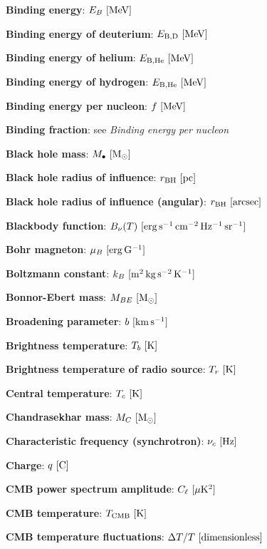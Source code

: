 \documentclass[a4paper,10pt]{article}
\begin{document}
{\noindent}\textbf{Binding energy}: $E_B ~ [{\rm MeV}]$

{\noindent}\textbf{Binding energy of deuterium}: $E_\mathrm{B,D} ~ [{\rm MeV}]$

{\noindent}\textbf{Binding energy of helium}: $E_\mathrm{B,He} ~ [{\rm MeV}]$

{\noindent}\textbf{Binding energy of hydrogen}: $E_\mathrm{B,He} ~ [{\rm MeV}]$

{\noindent}\textbf{Binding energy per nucleon}: $f ~ [{\rm MeV}]$

{\noindent}\textbf{Binding fraction}: see \textit{Binding energy per nucleon}

{\noindent}\textbf{Black hole mass}: $M_\bullet ~ [{\rm M_\odot}]$

{\noindent}\textbf{Black hole radius of influence}: $r_\mathrm{BH} ~ [{\rm pc}]$

{\noindent}\textbf{Black hole radius of influence (angular)}: $r_\mathrm{BH} ~ [{\rm arcsec}]$

{\noindent}\textbf{Blackbody function}: $B_\nu(T) ~ [{\rm erg\,s^{-1}\,cm^{-2}\,Hz^{-1}\,sr^{-1}}]$

{\noindent}\textbf{Bohr magneton}: $\mu_B ~ [{\rm erg\,G^{-1}}]$

{\noindent}\textbf{Boltzmann constant}: $k_B ~ [{\rm m^2\,kg\,s^{-2}\,K^{-1}}]$

{\noindent}\textbf{Bonnor-Ebert mass}: $M_{BE} ~ [{\rm M_\odot}]$

{\noindent}\textbf{Broadening parameter}: $b ~ [{\rm km\,s^{-1}}]$

{\noindent}\textbf{Brightness temperature}: $T_b ~ [{\rm K}]$

{\noindent}\textbf{Brightness temperature of radio source}: $T_r ~ [{\rm K}]$

{\noindent}\textbf{Central temperature}: $T_c ~ [{\rm K}]$

{\noindent}\textbf{Chandrasekhar mass}: $M_C ~ [{\rm M_\odot}]$

{\noindent}\textbf{Characteristic frequency (synchrotron)}: $\nu_c ~ [{\rm Hz}]$

{\noindent}\textbf{Charge}: $q ~ [{\rm C}]$

{\noindent}\textbf{CMB power spectrum amplitude}: $C_\ell ~ [{\rm \mu K^2}]$

{\noindent}\textbf{CMB temperature}: $T_\mathrm{CMB} ~ [{\rm K}]$

{\noindent}\textbf{CMB temperature fluctuations}: $\Delta T/T ~ [{\rm dimensionless}]$
\end{document}
